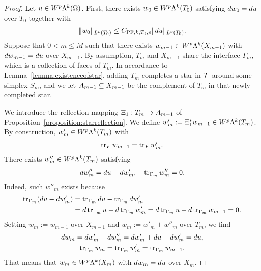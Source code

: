 \documentclass[10pt,a4paper]{article}
\begin{document}
\begin{proof}
    Let $u \in W^{p}\Lambda^{k}(\Omega)$. 
    First, there exists $w_0 \in W^{p}\Lambda^{k}(T_{0})$ satisfying $d w_0 = d u$ over $T_{0}$ together with 
    \begin{gather*}
        \| w_0 \|_{L^{p}(T_{0})} \leq C_{{{\rm PF}},k,T_{0},p} \| d u \|_{L^{p}(T_{0})}.
    \end{gather*}
    Suppose that $0 < m \leq M$ such that there exists $w_{m-1} \in W^{p}\Lambda^{k}(X_{m-1})$ 
    with $d w_{m-1} = d u$ over $X_{m-1}$. 
    By assumption, $T_{m}$ and $X_{m-1}$ share the interface $\Gamma_{m}$, which is a collection of faces of $T_{m}$. 
    In accordance to Lemma~\ref{lemma:existenceofstar}, adding $T_{m}$ completes a star in ${\mathcal T}$ around some simplex $S_{m}$, 
    and we let $A_{m-1} \subseteq X_{m-1}$ be the complement of $T_{m}$ in that newly completed star. 
    
    We introduce the reflection mapping $\Xi_{1} : T_{m} \rightarrow A_{m-1}$ of Proposition~\ref{proposition:starreflection}. 
    We define $w'_{m} :=  \Xi_{1}^{\ast} w_{m-1} \in W^{p}\Lambda^{k}(T_{m})$. 
    By construction, $w'_{m} \in W^{p}\Lambda^{k}(T_{m})$ with 
    \begin{align*}
        \operatorname{tr}_F w_{m-1} = \operatorname{tr}_F w'_{m}
        . 
    \end{align*}
    There exists $w''_{m} \in W^{p}\Lambda^{k}(T_{m})$ satisfying 
    \begin{align*}
        d w''_{m} = d u - d w'_{m}, 
        \quad 
        \operatorname{tr}_{\Gamma_{m}} w''_{m} = 0.
    \end{align*}
    Indeed, such $w''_{m}$ exists because 
    \begin{align*}
        \operatorname{tr}_{\Gamma_{m}}( d u - d w'_{m} ) 
        &= 
        \operatorname{tr}_{\Gamma_{m}} d u - \operatorname{tr}_{\Gamma_{m}} d w'_{m}
        \\&= 
        d \operatorname{tr}_{\Gamma_{m}} u - d \operatorname{tr}_{\Gamma_{m}} w'_{m}
        = 
        d \operatorname{tr}_{\Gamma_{m}} u - d \operatorname{tr}_{\Gamma_{m}} w_{m-1}
        = 
        0
        .
    \end{align*}
    Setting $w_{m} := w_{m-1}$ over $X_{m-1}$ and $w_{m} := w'_{m} + w''_{m}$ over $T_{m}$, 
    we find 
    \begin{gather*}
        d w_{m} = d w'_{m} + d w''_{m} = d w'_{m} + d u - d w'_{m} = d u,
        \\
        \operatorname{tr}_{\Gamma_{m}} w_{m} = \operatorname{tr}_{\Gamma_{m}} w'_{m} = \operatorname{tr}_{\Gamma_{m}} w_{m-1}.
    \end{gather*}
    That means that $w_{m} \in W^{p}\Lambda^{k}(X_{m})$ with $d w_{m} = d u$ over $X_{m}$. 
    

\end{proof}
\end{document}
